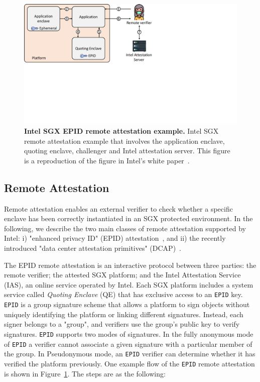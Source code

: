 \begin{figure}[t]
  \centering
    \includegraphics[trim={0 9cm 12cm 0},clip,width=0.9\linewidth]{chapters/background/figures/remote_attestation.pdf}
    \caption[Intel SGX EPID remote attestation example]{\textbf{Intel SGX EPID remote attestation example.} Intel SGX remote attestation example that involves the application enclave, quoting enclave, challenger and Intel attestation server. This figure is a reproduction of the figure in Intel's white paper~\cite{attestation_primitive_all}.}
    \label{fig:ra_bg}
\end{figure}

\subsection{Remote Attestation}
\label{ch:background:SGX:remote}

Remote attestation enables an external verifier to check whether a specific enclave has been correctly instantiated in an SGX protected environment. In the following, we describe the two main classes of remote attestation supported by Intel: i) "enhanced privacy ID" (EPID) attestation~\cite{epid_attestation}, and ii) the recently introduced "data center attestation primitives" (DCAP)~\cite{DCAP}. 


The EPID remote attestation is an interactive protocol between three parties: the remote verifier; the attested SGX platform; and the Intel Attestation Service (IAS), an online service operated by Intel. Each SGX platform includes a system service called \emph{Quoting Enclave} (QE) that has exclusive access to an \texttt{EPID} key. \texttt{EPID} is a group signature scheme that allows a platform to sign objects without uniquely identifying the platform or linking different signatures. Instead, each signer belongs to a "group", and verifiers use the group's public key to verify signatures. \texttt{EPID} supports two modes of signatures. In the fully anonymous mode of \texttt{EPID} a verifier cannot associate a given signature with a particular member of the group. In Pseudonymous mode, an \texttt{EPID} verifier can determine whether it has verified the platform previously.
One example flow of the \texttt{EPID} remote attestation is shown in Figure~\ref{fig:ra_bg}. The steps are as the following:


